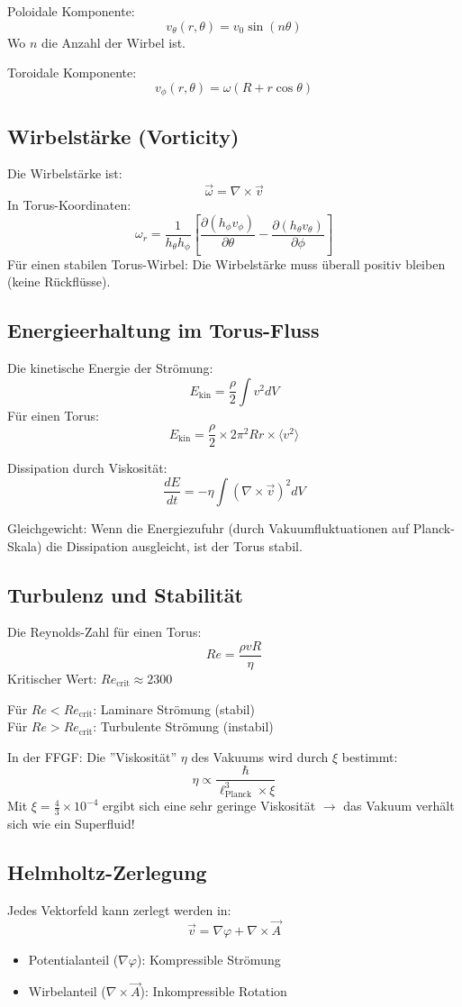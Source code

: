 	Poloidale Komponente:
	\[
	v_\theta(r, \theta) = v_0 \sin(n \theta)
	\]
	Wo \( n \) die Anzahl der Wirbel ist.
	
	Toroidale Komponente:
	\[
	v_\phi(r, \theta) = \omega (R + r \cos \theta)
	\]
	
	\subsection{Wirbelstärke (Vorticity)}
	Die Wirbelstärke ist:
	\[
	\vec{\omega} = \nabla \times \vec{v}
	\]
	In Torus-Koordinaten:
	\[
	\omega_r = \frac{1}{h_\theta h_\phi} \left[ \frac{\partial (h_\phi v_\phi)}{\partial \theta} - \frac{\partial (h_\theta v_\theta)}{\partial \phi} \right]
	\]
	Für einen stabilen Torus-Wirbel: Die Wirbelstärke muss überall positiv bleiben (keine Rückflüsse).
	
	\subsection{Energieerhaltung im Torus-Fluss}
	Die kinetische Energie der Strömung:
	\[
	E_{\text{kin}} = \frac{\rho}{2} \int v^2 dV
	\]
	Für einen Torus:
	\[
	E_{\text{kin}} = \frac{\rho}{2} \times 2\pi^2 R r \times \langle v^2 \rangle
	\]
	
	Dissipation durch Viskosität:
	\[
	\frac{dE}{dt} = -\eta \int (\nabla \times \vec{v})^2 dV
	\]
	
	Gleichgewicht: Wenn die Energiezufuhr (durch Vakuumfluktuationen auf Planck-Skala) die Dissipation ausgleicht, ist der Torus stabil.
	
	\subsection{Turbulenz und Stabilität}
	Die Reynolds-Zahl für einen Torus:
	\[
	Re = \frac{\rho v R}{\eta}
	\]
	Kritischer Wert: \( Re_{\text{crit}} \approx 2300 \)
	
	Für \( Re < Re_{\text{crit}} \): Laminare Strömung (stabil) \\
	Für \( Re > Re_{\text{crit}} \): Turbulente Strömung (instabil)
	
	In der FFGF:
	Die ''Viskosität'' \( \eta \) des Vakuums wird durch \( \xi \) bestimmt:
	\[
	\eta \propto \frac{\hbar}{\ell_{\text{Planck}}^3 \times \xi}
	\]
	Mit \( \xi = \frac{4}{3} \times 10^{-4} \) ergibt sich eine sehr geringe Viskosität \( \rightarrow \) das Vakuum verhält sich wie ein Superfluid!
	
	\subsection{Helmholtz-Zerlegung}
	Jedes Vektorfeld kann zerlegt werden in:
	\[
	\vec{v} = \nabla \varphi + \nabla \times \vec{A}
	\]
	\begin{itemize}
		\item Potentialanteil (\( \nabla \varphi \)): Kompressible Strömung
		\item Wirbelanteil (\( \nabla \times \vec{A} \)): Inkompressible Rotation
	\end{itemize}
	
